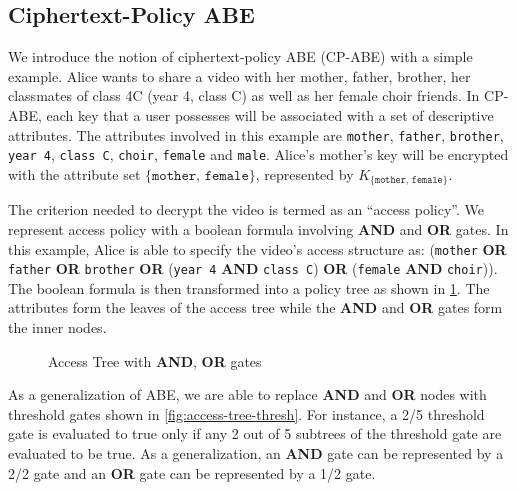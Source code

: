 \documentclass[hyp,a4paper,12pt,openbib]{socreport}
\begin{document}
\subsection{Ciphertext-Policy ABE}
We introduce the notion of ciphertext-policy ABE (CP-ABE) with a simple example. Alice wants to share a video with her mother, father, brother, her classmates of class 4C (year 4, class C) as well as her female choir friends. In CP-ABE, each key that a user possesses will be associated with a set of descriptive attributes. The attributes involved in this example are \texttt{mother}, \texttt{father}, \texttt{brother}, \texttt{year 4}, \texttt{class C}, \texttt{choir}, \texttt{female} and  \texttt{male}. Alice's mother's key will be encrypted with the attribute set $\{\texttt{mother, female}\}$, represented by $K_{\{\texttt{mother, female}\}}$. 

The criterion needed to decrypt the video is termed as an ``access policy''. We represent access policy with a boolean formula involving \textbf{AND} and \textbf{OR} gates. In this example, Alice is able to specify the video's access structure as: (\texttt{mother} \textbf{OR} \texttt{father} \textbf{OR} \texttt{brother} \textbf{OR} (\texttt{year 4} \textbf{AND} \texttt{class C}) \textbf{OR} (\texttt{female} \textbf{AND} \texttt{choir})). The boolean formula is then transformed into a policy tree as shown in \cref{fig:access-tree}. The attributes form the leaves of the access tree while the \textbf{AND} and \textbf{OR} gates form the inner nodes. 


\begin{figure}[h]
\centering
{}
\caption{Access Tree with \textbf{AND}, \textbf{OR} gates} \label{fig:access-tree}
\end{figure}


As a generalization of ABE, we are able to replace \textbf{AND} and \textbf{OR} nodes with threshold gates shown in \cref{fig:access-tree-thresh}. For instance, a 2/5 threshold gate is evaluated to true only if any 2 out of 5 subtrees of the threshold gate are evaluated to be true. As a generalization, an \textbf{AND} gate can be represented by a 2/2 gate and an \textbf{OR} gate can be represented by a 1/2 gate.
\end{document}
